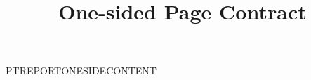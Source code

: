 \documentclass[oneside,nominted]{pt-report}
\title{One-sided Page Contract}
\date{}
\begin{document}
\maketitle
\noindent PTREPORTONESIDECONTENT
\end{document}
